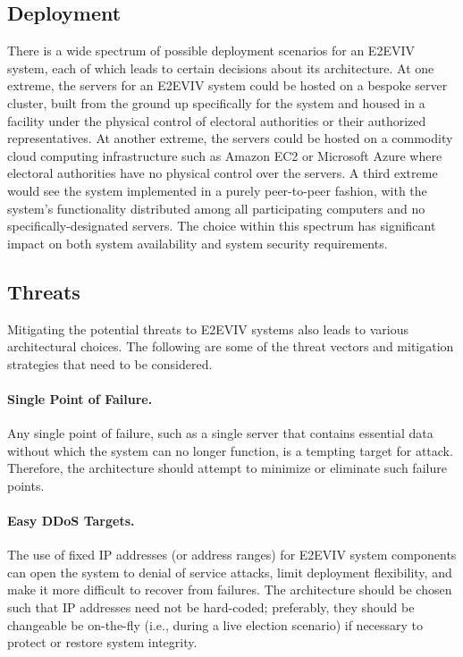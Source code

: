 
\subsection{Deployment}

There is a wide spectrum of possible deployment scenarios for an
E2EVIV system, each of which leads to certain decisions about its
architecture. At one extreme, the servers for an E2EVIV system could
be hosted on a bespoke server cluster, built from the ground up
specifically for the system and housed in a facility under the
physical control of electoral authorities or their authorized
representatives. At another extreme, the servers could be hosted on a
commodity cloud computing infrastructure such as Amazon EC2 or
Microsoft Azure where electoral authorities have no physical control
over the servers. A third extreme would see the system implemented in
a purely peer-to-peer fashion, with the system's functionality
distributed among all participating computers and no
specifically-designated servers. The choice within this spectrum has
significant impact on both system availability and system security
requirements.

\subsection{Threats}
\label{sec:threats}

Mitigating the potential threats to E2EVIV systems also leads to
various architectural choices. The following are some of the threat
vectors and mitigation strategies that need to be considered.

\paragraph {Single Point of Failure.} Any single point of failure,
such as a single server that contains essential data without which the
system can no longer function, is a tempting target for
attack. Therefore, the architecture should attempt to minimize or
eliminate such failure points.

\paragraph{Easy DDoS Targets.} The use of fixed IP addresses (or
address ranges) for E2EVIV system components can open the system to
denial of service attacks, limit deployment flexibility, and make it
more difficult to recover from failures. The architecture should be
chosen such that IP addresses need not be hard-coded; preferably, they
should be changeable be on-the-fly (i.e., during a live election
scenario) if necessary to protect or restore system integrity.

